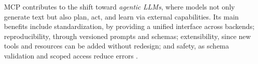 MCP contributes to the shift toward \textit{agentic LLMs}, where models not only generate text but also plan, act, and learn via external capabilities. Its main benefits include standardization, by providing a unified interface across backends; reproducibility, through versioned prompts and schemas; extensibility, since new tools and resources can be added without redesign; and safety, as schema validation and scoped access reduce errors \cite{mcp-spec}.





